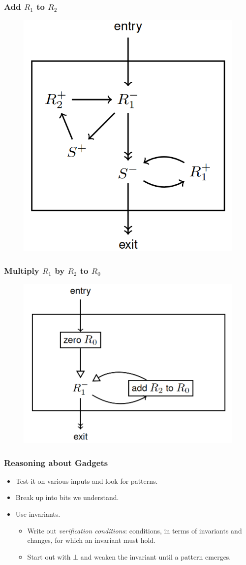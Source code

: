 \documentclass[twocolumn,english]{article}
\begin{document}
\subsubsection*{Add $R_{1}$ to $R_{2}$}

\begin{figure}[H]
\centering{}\includegraphics[width=0.4\columnwidth]{img/add}
\end{figure}

\subsubsection*{Multiply $R_{1}$ by $R_{2}$ to $R_{0}$}

\begin{figure}[H]
\centering{}\includegraphics[width=0.6\columnwidth]{img/mult}
\end{figure}

\subsubsection{Reasoning about Gadgets}
\begin{itemize}
\item Test it on various inputs and look for patterns.
\item Break up into bits we understand.
\item Use invariants.
\begin{itemize}
\item Write out \emph{verification conditions}: conditions, in terms of
invariants and changes, for which an invariant must hold.
\item Start out with $\bot$ and weaken the invariant until a pattern emerges.
\end{itemize}
\end{itemize}
\end{document}
